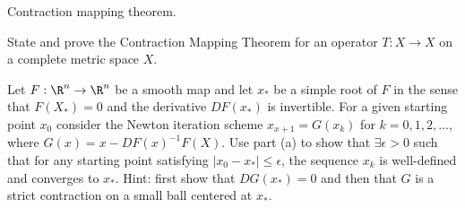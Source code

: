 Contraction mapping theorem. 
\begin{alist}
\item State and prove the Contraction Mapping Theorem for an operator
$T:X\rightarrow X$ on a complete metric space $X$.
\item Let $F:\R^n\rightarrow \R^n$ be a smooth map and let $x_*$ be a
simple root of $F$ in the sense that $F(X_*)=0$ and the derivative
$DF(x_*)$ is invertible. For a given starting point $x_0$ consider
the Newton iteration scheme $x_{x+1}=G(x_k)$ for $k=0,1,2,\ldots $,
where $G(x)=x-DF(x)^{-1}F(X)$. Use part (a) to show that $\exists
\epsilon>0$ such that for any starting point satisfying
$|x_0-x_*|\leq\epsilon$, the sequence $x_k$ is well-defined and
converges to $x_*$. Hint: first show that $DG(x_*)=0$ and then that
$G$ is a strict contraction on a small ball centered at $x_*$.
\end{alist}


